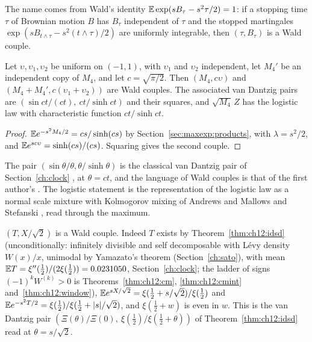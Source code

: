 The name comes from Wald's identity $\mathbb{E}\exp(sB_\tau-s^2\tau/2)=1$: if a stopping time $\tau$ of Brownian motion $B$ has $B_\tau$ independent of $\tau$ and the stopped martingales $\exp(sB_{t\wedge\tau}-s^2(t\wedge\tau)/2)$ are uniformly integrable, then $(\tau,B_\tau)$ is a Wald couple.

\begin{theorem}\label{mw:thm:wald}
Let $\upsilon,\upsilon_1,\upsilon_2$ be uniform on $(-1,1)$, with $\upsilon_1$ and $\upsilon_2$ independent, let $M_4'$ be an independent copy of $M_4$, and let $c=\sqrt{\pi/2}$. Then $(M_4,c\upsilon)$ and $(M_4+M_4',c(\upsilon_1+\upsilon_2))$ are Wald couples. The associated van Dantzig pairs are $(\sin ct/(ct),\ ct/\sinh ct)$ and their squares, and $\sqrt{M_4}\,Z$ has the logistic law with characteristic function $ct/\sinh ct$.
\end{theorem}

\begin{proof}
$\mathbb{E} e^{-s^2M_4/2}=cs/\sinh(cs)$ by Section~\ref{sec:maxexp:products}, with $\lambda=s^2/2$, and $\mathbb{E} e^{sc\upsilon}=\sinh(cs)/(cs)$. Squaring gives the second couple.
\end{proof}

The pair $(\sin\theta/\theta,\theta/\sinh\theta)$ is the classical van Dantzig pair of Section~\ref{ch:clock} \cite{Lukacs68}, at $\theta=ct$, and the language of Wald couples is that of the first author's \cite{P18}. The logistic statement is the representation of the logistic law as a normal scale mixture with Kolmogorov mixing of Andrews and Mallows \cite{AndrewsMallows74} and Stefanski \cite{Stefanski91}, read through the maximum.

\begin{remark}\label{mw:rem:waldT}
$(T,X/\sqrt2)$ is a Wald couple. Indeed $T$ exists by Theorem~\ref{thm:ch12:idsd} (unconditionally: infinitely divisible and self decomposable with L\'evy density $W(x)/x$, unimodal by Yamazato's theorem \cite{Yamazato78} (Section~\ref{ch:sato}), with mean $\mathbb{E} T=\xi''(\frac12)/(2\xi(\frac12))=0.0231050$, Section~\ref{ch:clock}; the ladder of signs $(-1)^kW^{(k)}>0$ is Theorems~\ref{thm:ch12:cm}, \ref{thm:ch12:cmint} and~\ref{thm:ch12:window}), $\mathbb{E} e^{sX/\sqrt2}=\xi(\frac12+s/\sqrt2)/\xi(\frac12)$ and $\mathbb{E} e^{-s^2T/2}=\xi(\frac12)/\xi(\frac12+|s|/\sqrt2)$, and $\xi(\frac12+w)$ is even in $w$. This is the van Dantzig pair $(\Xi(\theta)/\Xi(0),\ \xi(\frac12)/\xi(\frac12+\theta))$ of Theorem~\ref{thm:ch12:idsd} read at $\theta=s/\sqrt2$.
\end{remark}

